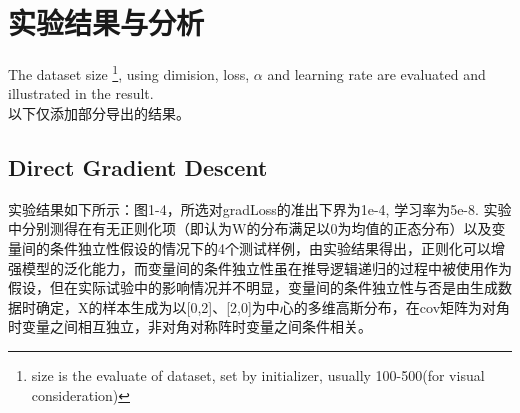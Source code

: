 \documentclass{article}
\begin{document}
\section{实验结果与分析}
The dataset size \footnote{size is the evaluate of dataset, set by initializer, usually 100-500(for visual consideration)}, using dimision, loss, $\alpha$ and learning rate are evaluated and illustrated in the result.
\\
以下仅添加部分导出的结果。
\subsection{Direct Gradient Descent}
实验结果如下所示：图1-4，所选对gradLoss的准出下界为1e-4, 学习率为5e-8. 实验中分别测得在有无正则化项（即认为W的分布满足以0为均值的正态分布）以及变量间的条件独立性假设的情况下的4个测试样例，由实验结果得出，正则化可以增强模型的泛化能力，而变量间的条件独立性虽在推导逻辑递归的过程中被使用作为假设，但在实际试验中的影响情况并不明显，变量间的条件独立性与否是由生成数据时确定，X的样本生成为以[0,2]、[2,0]为中心的多维高斯分布，在cov矩阵为对角时变量之间相互独立，非对角对称阵时变量之间条件相关。
\end{document}
